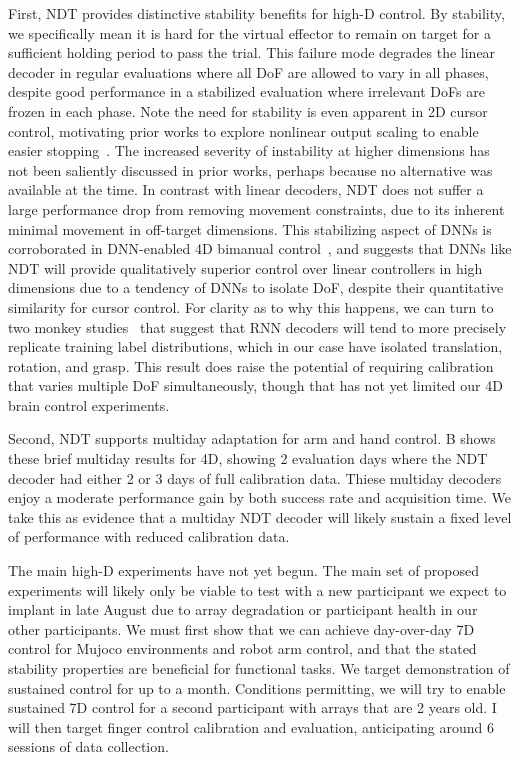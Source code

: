 \documentclass[12pt,oneside]{report}
\begin{document}
First, NDT provides distinctive stability benefits for high-D control. By stability, we specifically mean it is hard for the virtual effector to remain on target for a sufficient holding period to pass the trial. This failure mode degrades the linear decoder in regular evaluations where all DoF are allowed to vary in all phases, despite good performance in a stabilized evaluation where irrelevant DoFs are frozen in each phase. Note the need for stability is even apparent in 2D cursor control, motivating prior works to explore nonlinear output scaling to enable easier stopping~\citep{sachs2015brain,card2025long}.
The increased severity of instability at higher dimensions has not been saliently discussed in prior works, perhaps because no alternative was available at the time. In contrast with linear decoders, NDT does not suffer a large performance drop from removing movement constraints, due to its inherent minimal movement in off-target dimensions. This stabilizing aspect of DNNs is corroborated in DNN-enabled 4D bimanual control~\citep{deo_23_impulse}, and suggests that DNNs like NDT will provide qualitatively superior control over linear controllers in high dimensions due to a tendency of DNNs to isolate DoF, despite their quantitative similarity for cursor control. For clarity as to why this happens, we can turn to two monkey studies~\citep{temmar2024artificial,costello2023balancing} that suggest that RNN decoders will tend to more precisely replicate training label distributions, which in our case have isolated translation, rotation, and grasp. This result does raise the potential of requiring calibration that varies multiple DoF simultaneously, though that has not yet limited our 4D brain control experiments.

Second, NDT supports multiday adaptation for arm and hand control. B shows these brief multiday results for 4D, showing 2 evaluation days where the NDT decoder had either 2 or 3 days of full calibration data. Thiese multiday decoders enjoy a moderate performance gain by both success rate and acquisition time. We take this as evidence that a multiday NDT decoder will likely sustain a fixed level of performance with reduced calibration data.

The main high-D experiments have not yet begun. The main set of proposed experiments will likely only be viable to test with a new participant we expect to implant in late August due to array degradation or participant health in our other participants. We must first show that we can achieve day-over-day 7D control for Mujoco environments and robot arm control, and that the stated stability properties are beneficial for functional tasks. We target demonstration of sustained control for up to a month. Conditions permitting, we will try to enable sustained 7D control for a second participant with arrays that are 2 years old. I will then target finger control calibration and evaluation, anticipating around 6 sessions of data collection.
\end{document}
